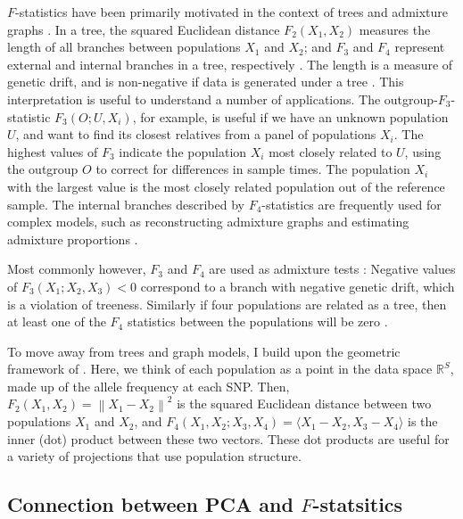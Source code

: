 \documentclass[12pt,fullpage, a4paper]{article}
\newcommand{\normsq}[1]{\left\lVert#1\right\rVert^2}
\begin{document}
$F$-statistics have been primarily motivated in the context of trees and admixture graphs \citep{patterson2012}. In a tree, the squared Euclidean distance $F_2(X_1, X_2)$ measures the length of all branches between populations $X_1$ and $X_2$; and $F_3$ and $F_4$ represent external and internal branches in a tree, respectively \citep{peter2016}. The length is a measure of genetic drift, and is non-negative if data is generated under a tree \citep{patterson2012}. This interpretation is useful to understand a number of applications. The outgroup-$F_3$-statistic $F_3(O; U, X_i)$, for example, is useful if we have an unknown population $U$, and want to find its closest relatives from a panel of populations $X_i$. The highest values of $F_3$ indicate the population $X_i$ most closely related to $U$, using the outgroup $O$ to correct for differences in sample times. The population $X_i$ with the largest value is the most closely related population out of the reference sample. The internal branches described by  $F_4$-statistics are frequently used for complex models, such as  reconstructing admixture graphs \citep{patterson2012, lipson2013} and estimating admixture proportions \citep{petr2019, harney2021}.

Most commonly however, $F_3$ and $F_4$ are used as admixture tests \citep{patterson2012}: Negative values of  $F_3(X_1; X_2, X_3) < 0$ correspond to a branch with negative genetic drift, which is a violation of treeness. Similarly if four populations are related as a tree, then at least one of the $F_4$ statistics between the populations will be zero \citep{patterson2012}.

To move away from trees and graph models, I build upon the geometric framework of \cite{oteo-garcia2021}. Here, we think of each population as a point in the data space $\mathbb{R}^S$, made up of the allele frequency at each SNP. Then, $F_2(X_1, X_2) = \normsq{X_1 - X_2}$ is the squared Euclidean distance between two populations $X_1$ and $X_2$, and $F_4(X_1, X_2 ; X_3, X_4) = \langle X_1 - X_2, X_3 - X_4 \rangle$ is the inner (dot) product between these two vectors. These dot products are useful for a variety of projections that use population structure.

\subsection{Connection between PCA and $F$-statsitics}	
\end{document}
